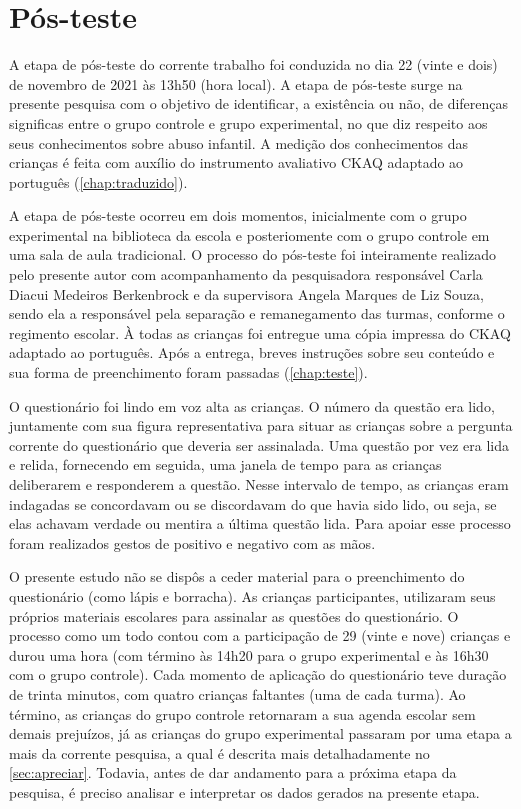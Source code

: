 \section{Pós-teste}\label{sec:postes}

A etapa de pós-teste do corrente trabalho foi conduzida no dia 22 (vinte e dois) de novembro de 2021 às 13h50 (hora local). A etapa de pós-teste surge na presente pesquisa com o objetivo de identificar, a existência ou não, de diferenças significas entre o grupo controle e grupo experimental, no que diz respeito aos seus conhecimentos sobre abuso infantil. A medição dos conhecimentos das crianças é feita com auxílio do instrumento avaliativo \acf{CKAQ} adaptado ao português (\autoref{chap:traduzido}). 

A etapa de pós-teste ocorreu em dois momentos, inicialmente com o grupo experimental na biblioteca da escola e posteriomente com o grupo controle em uma sala de aula tradicional. O processo do pós-teste foi inteiramente realizado pelo presente autor com acompanhamento da pesquisadora responsável Carla Diacui Medeiros Berkenbrock e da supervisora Angela Marques de Liz Souza, sendo ela a responsável pela separação e remanegamento das turmas, conforme o regimento escolar. À todas as crianças foi entregue uma cópia impressa do \ac{CKAQ} adaptado ao português. Após a entrega, breves instruções sobre seu conteúdo e sua forma de preenchimento foram passadas (\autoref{chap:teste}).

O questionário foi lindo em voz alta as crianças. O número da questão era lido, juntamente com sua figura representativa para situar as crianças sobre a pergunta corrente do questionário que deveria ser assinalada. Uma questão por vez era lida e relida, fornecendo em seguida, uma janela de tempo para as crianças deliberarem e responderem a questão. Nesse intervalo de tempo, as crianças eram indagadas se concordavam ou se discordavam do que havia sido lido, ou seja, se elas achavam verdade ou mentira a última questão lida. Para apoiar esse processo foram realizados gestos de positivo e negativo com as mãos.

O presente estudo não se dispôs a ceder material para o preenchimento do questionário (como lápis e borracha). As crianças participantes, utilizaram seus próprios materiais escolares para assinalar as questões do questionário. O processo como um todo contou com a participação de 29 (vinte e nove) crianças e durou uma hora (com término às 14h20 para o grupo experimental e às 16h30 com o grupo controle). Cada momento de aplicação do questionário teve duração de trinta minutos, com quatro crianças faltantes (uma de cada turma). Ao término, as crianças do grupo controle retornaram a sua agenda escolar sem demais prejuízos, já as crianças do grupo experimental passaram por uma etapa a mais da corrente pesquisa, a qual é descrita mais detalhadamente no \autoref{sec:apreciar}. Todavia, antes de dar andamento para a próxima etapa da pesquisa, é preciso analisar e interpretar os dados gerados na presente etapa. 

